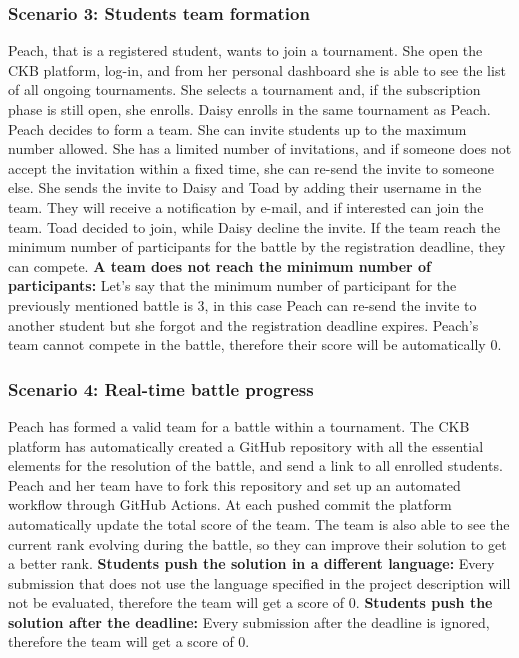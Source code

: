 \subsubsection{Scenario 3: Students team formation}
Peach, that is a registered student, wants to join a tournament. She open the CKB platform, log-in, and from her personal dashboard she is able to see the list of all ongoing tournaments. She selects a tournament and, if the subscription phase is still open, she enrolls.
Daisy enrolls in the same tournament as Peach. \newline
Peach decides to form a team. She can invite students up to the maximum number allowed. She has a limited number of invitations, and if someone does not accept the invitation within a fixed time, she can re-send the invite to someone else.
She sends the invite to Daisy and Toad by adding their username in the team. They will receive a notification by e-mail, and if interested can join the team. Toad decided to join, while Daisy decline the invite. \newline
If the team reach the minimum number of participants for the battle by the registration deadline, they can compete. \newline
\textbf{A team does not reach the minimum number of participants:} Let's say that the minimum number of participant for the  previously mentioned battle is 3, in this case Peach can re-send the invite to another student but she forgot and the registration deadline expires.
Peach's team cannot compete in the battle, therefore their score will be automatically 0.

\subsubsection{Scenario 4: Real-time battle progress}
Peach has formed a valid team for a battle within a tournament. The CKB platform has automatically created a GitHub repository with all the essential elements for the resolution of the battle, and send a link to all enrolled students.
Peach and her team have to fork this repository and set up an automated workflow 
through GitHub Actions. At each pushed commit the platform automatically update the total score of the team. The team is also able to see the current rank evolving during the battle, so they can improve their solution to get a better rank.\newline
\textbf{Students push the solution in a different language:} Every submission that does not use the language specified in the project description will not be evaluated, therefore the team will get a score of 0.  \newline
\textbf{Students push the solution after the deadline:} Every submission after the deadline is ignored, therefore the team will get a score of 0. 

